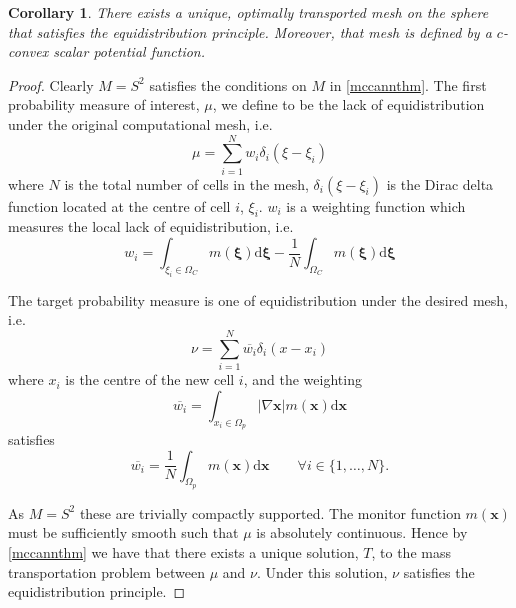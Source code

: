 \documentclass{article}
\newtheorem{corollary}{Corollary}
\theoremstyle{definition}
\begin{document}
\begin{corollary}
There exists a unique, optimally transported mesh on the sphere that satisfies the equidistribution principle. Moreover, that mesh is defined by a $c$-convex scalar potential function.
\end{corollary}

\begin{proof}
Clearly $M=S^2$ satisfies the conditions on $M$ in \autoref{mccannthm}. The first probability measure of interest, $\mu$, we define to be the lack of equidistribution under the original computational mesh, i.e.
\begin{equation}
\mu = \sum_{i=1}^{N}w_i \delta_i(\xi -\xi_i)
\end{equation}
where $N$ is the total number of cells in the mesh, $\delta_i(\xi -\xi_i)$ is the Dirac delta function located at the centre of cell $i$, $\xi_i$. $w_i$ is a weighting function which measures the local lack of equidistribution, i.e.
\begin{equation}
w_i = \int_{\xi_i \in \Omega_C} m(\mathbf{\xi}) \mathrm{d}\mathbf{\xi} - \frac{1}{N}\int_{\Omega_C} m(\mathbf{\xi}) \mathrm{d}\mathbf{\xi}
\end{equation}


The target probability measure is one of equidistribution under the desired mesh, i.e.
\begin{equation}
\nu = \sum_{i=1}^{N}\overline{w_i} \delta_i(x -x_i)
\end{equation}
where $x_i$ is the centre of the new cell $i$, and the weighting
\begin{equation}
\overline{w_i} = \int_{x_i \in \Omega_p} |\nabla \mathbf{x}|m(\mathbf{x}) \mathrm{d}\mathbf{x}%
\end{equation}
satisfies 
\begin{equation}
\overline{w_i} =\frac{1}{N}\int_{\Omega_p} m(\mathbf{x}) \mathrm{d}\mathbf{x} \qquad \forall i \in \{1,\ldots,N\}.
\end{equation}

As $M=S^2$ these are trivially compactly supported. The monitor function $m(\mathbf{x})$ must be sufficiently smooth such that $\mu$ is absolutely continuous.
Hence by \autoref{mccannthm} we have that there exists a unique solution, $T$, to the mass transportation problem between $\mu$ and $\nu$. Under this solution, $\nu$ satisfies the equidistribution principle.


\end{proof}
\end{document}
